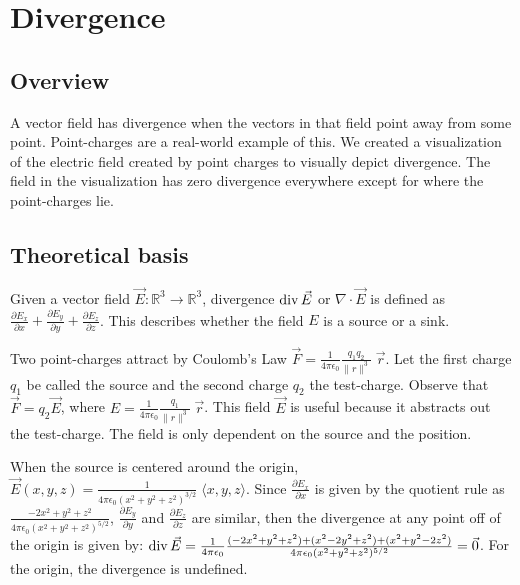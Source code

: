 \section{Divergence}

\subsection*{Overview}

A vector field has divergence when the vectors in that field point away from some point. Point-charges are a real-world example of this. We created a visualization of the electric field created by point charges to visually depict divergence. The field in the visualization has zero divergence everywhere except for where the point-charges lie. \cite{divergence1} \cite{divergence2}

\subsection*{Theoretical basis}

Given a vector field \(\vec E : \mathbb R^3 \to \mathbb R^3\), divergence \(\operatorname{div} \vec E\) or \(\nabla \cdot \vec E\) is defined as \(\frac{\partial E_x}{\partial x} + \frac{\partial E_y}{\partial y} + \frac{\partial E_z}{\partial z}\). This describes whether the field \(E\) is a source or a sink.

Two point-charges attract by Coulomb's Law \(\vec F = \frac{1}{4 \pi \epsilon_0} \frac{q_1 q_2}{\|r\|^3} \;\vec r\). Let the first charge \(q_1\) be called the source and the second charge \(q_2\) the test-charge. Observe that \(\vec F = q_2 \vec E\), where \(E = \frac{1}{4 \pi \epsilon_0} \frac{q_1}{\|r\|^3} \;\vec r\). This field \(\vec E\) is useful because it abstracts out the test-charge. The field is only dependent on the source and the position.

When the source is centered around the origin, \(\vec E(x, y, z) = \frac{1}{4 \pi \epsilon_0 (x^2+y^2+z^2)^{3/2}} \; \langle x, y, z \rangle\). Since \(\frac{\partial E_x}{\partial x}\) is given by the quotient rule as \(\frac{-2x^2+y^2+z^2}{4 \pi \epsilon_0 (x^2+y^2+z^2)^{5/2}}\), \(\frac{\partial E_y}{\partial y}\) and \(\frac{\partial E_z}{\partial z}\) are similar, then the divergence at any point off of the origin is given by: \(\operatorname{div} \vec E = \frac{1}{4 \pi \epsilon_0} \frac{(-2x^2 + y^2 + z^2) + (x^2 - 2y^2 + z^2) + (x^2 + y^2 - 2z^2)}{4 \pi \epsilon_0 (x^2 + y^2 + z^2)^{5/2}} = \vec 0\). For the origin, the divergence is undefined.

